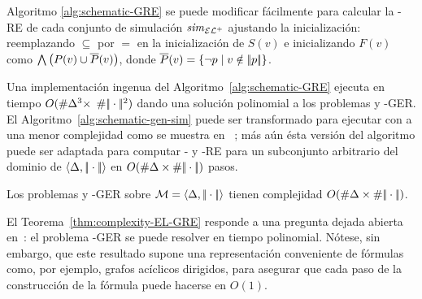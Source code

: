 Algoritmo \ref{alg:schematic-GRE} se puede modificar f\'acilmente para
calcular la \ELAN-RE de cada conjunto de simulaci\'on ${\it sim}_{{\mathcal{EL}^+}}$ 
ajustando la inicializaci\'on: reemplazando $\subseteq$ por $=$ en la
inicializaci\'on de $S(v)$ e inicializando $F(v)$ como
$\bigwedge\left(P(v)\cup\overline {P}(v)\right)$,
donde $\overline {P}(v)=\{\lnot p\mid v\notin|\!|p|\!|\}$.


Una implementaci\'on ingenua del Algoritmo~\ref{alg:schematic-GRE}
ejecuta en tiempo $O(\# \Delta^3\times$
$\# |\!|\cdot|\!|^2)$
dando una soluci\'on polinomial a los problemas \EL y \ELAN-GER.
El Algoritmo~\ref{alg:schematic-gen-sim} puede ser transformado para ejecutar con a una menor complejidad como se muestra en
~\cite{HHK95}; m\'as a\'un \'esta versi\'on del algoritmo puede ser adaptada para
computar \EL- y \ELAN-RE para un subconjunto arbitrario del dominio de $\langle \Delta,|\!|\cdot|\!| \rangle$
 en $O(\# \Delta\times\# |\!|\cdot|\!|)$ pasos. 


%

%
\begin{theorem}\label{thm:complexity-EL-GRE}
Los problemas \EL y \ELAN-GER sobre $\mathcal{M}=\langle \Delta,|\!|\cdot|\!| \rangle$ tienen complejidad
$O(\# \Delta\times\# |\!|\cdot|\!|)$.
\end{theorem}



El Teorema~\ref{thm:complexity-EL-GRE} responde a una pregunta dejada abierta
en~\cite{areces08}: el problema \EL-GER se puede resolver en tiempo polinomial. N\'otese, sin embargo, que este resultado supone una representaci\'on conveniente de
f\'ormulas como, por ejemplo, grafos ac\'iclicos dirigidos, para asegurar que
cada paso de la construcci\'on de la f\'ormula puede hacerse en $O(1)$. %

